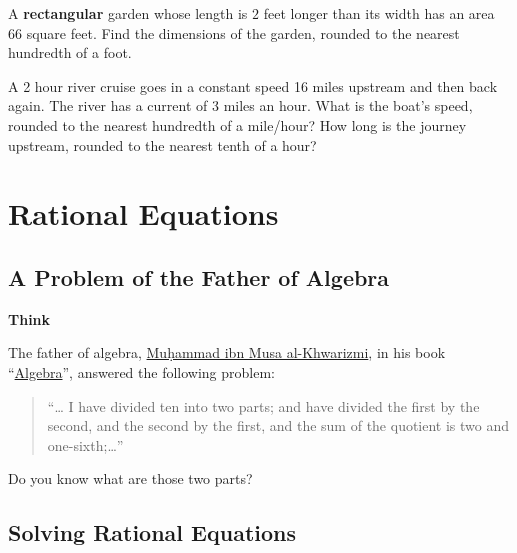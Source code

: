 \documentclass[en,12pt]{elegantbook}
\newenvironment{rmdthink}{
	\par\noindent
	{
		\makebox[-\width][r]{
			\footnotesize
			\color{green!90}\faLightbulbO
			\hspace*{3pt}
		}
			\textbf{
				\color{second}
				Think 
			}
    }
    \begin{shaded}
    \sffamily
}{
    \par\medskip\ignorespacesafterend
    \end{shaded}
}
\let\BeginKnitrBlock\begin \let\EndKnitrBlock\end
\begin{document}
\BeginKnitrBlock{exercise}
\protect\hypertarget{exr:unnamed-chunk-141}{}{\label{exr:unnamed-chunk-141} }
A \textbf{rectangular} garden whose length is \(2\) feet longer than its width has an area 66 square feet. Find the dimensions of the garden, rounded to the nearest hundredth of a foot.
\EndKnitrBlock{exercise}

\BeginKnitrBlock{exercise}
\protect\hypertarget{exr:unnamed-chunk-142}{}{\label{exr:unnamed-chunk-142} }
A 2 hour river cruise goes in a constant speed 16 miles upstream and then back again. The river has a current of 3 miles an hour. What is the boat's speed, rounded to the nearest hundredth of a mile/hour? How long is the journey upstream, rounded to the nearest tenth of a hour?
\EndKnitrBlock{exercise}

\hypertarget{rational-equations}{%
\chapter{Rational Equations}\label{rational-equations}}

\hypertarget{a-problem-of-the-father-of-algebra}{%
\section{A Problem of the Father of Algebra}\label{a-problem-of-the-father-of-algebra}}

\begin{rmdthink}

The father of algebra, \href{https://en.wikipedia.org/wiki/Muhammad_ibn_Musa_al-Khwarizmi\#Algebra}{Muḥammad ibn Musa al-Khwarizmi}, in his book ``\href{https://archive.org/details/algebraofmohamme00khuwrich/page/44/mode/2up}{Algebra}'', answered the following problem:

\begin{quote}
``\ldots{} I have divided ten into two parts; and have divided the first by the second, and the second by the first, and the sum of the quotient is two and one-sixth;\ldots{}''
\end{quote}

Do you know what are those two parts?

\end{rmdthink}

\hypertarget{solving-rational-equations}{%
\section{Solving Rational Equations}\label{solving-rational-equations}}
\end{document}
